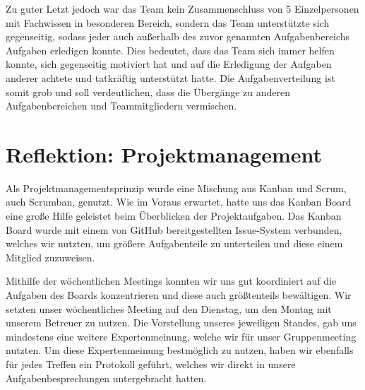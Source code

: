 Zu guter Letzt jedoch war das Team kein Zusammenschluss von 5 Einzelpersonen mit Fachwissen in besonderen Bereich, sondern das Team unterstützte sich gegenseitig, sodass jeder auch außerhalb des zuvor genannten Aufgabenbereichs Aufgaben erledigen konnte.
Dies bedeutet, dass das Team sich immer helfen konnte, sich gegenseitig motiviert hat und auf die Erledigung der Aufgaben anderer achtete und tatkräftig unterstützt hatte.
Die Aufgabenverteilung ist somit grob und soll verdeutlichen, dass die Übergänge zu anderen Aufgabenbereichen und Teammitgliedern vermischen.

\section{Reflektion: Projektmanagement}

Als Projektmanagementsprinzip wurde eine Mischung aus Kanban und Scrum, auch Scrumban, genutzt.
Wie im Voraus erwartet, hatte uns das Kanban Board eine große Hilfe geleistet beim Überblicken der Projektaufgaben.
Das Kanban Board wurde mit einem von GitHub bereitgestellten Issue-System verbunden, welches wir nutzten, um größere Aufgabenteile zu unterteilen und diese einem Mitglied zuzuweisen.

Mithilfe der wöchentlichen Meetings konnten wir uns gut koordiniert auf die Aufgaben des Boards konzentrieren und diese auch größtenteils bewältigen.
Wir setzten unser wöchentliches Meeting auf den Dienstag, um den Montag mit unserem Betreuer zu nutzen.
Die Vorstellung unseres jeweiligen Standes, gab uns mindestens eine weitere Expertenmeinung, welche wir für unser Gruppenmeeting nutzten.
Um diese Expertenmeinung bestmöglich zu nutzen, haben wir ebenfalls für jedes Treffen ein Protokoll geführt, welches wir direkt in unsere Aufgabenbesprechungen untergebracht hatten.



